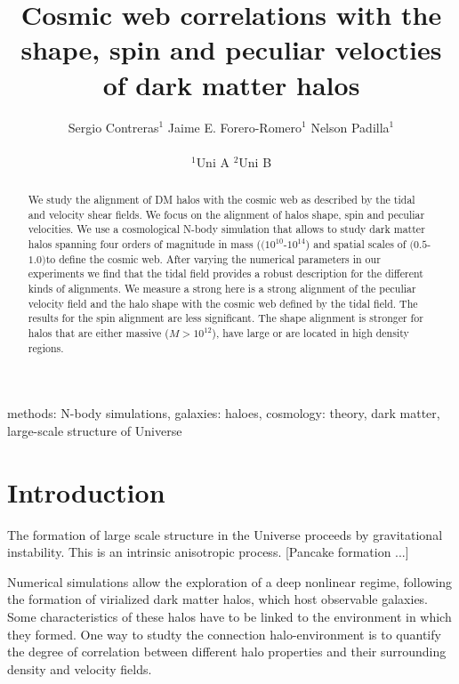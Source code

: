 \documentclass[usenatbib]{mn2e}
\newcommand{\hMpc}{{\ifmmode{h^{-1}{\rm Mpc}}\else{$h^{-1}$Mpc }\fi}}
\newcommand{\hMsun}{{\ifmmode{h^{-1}{\rm
        {M_{\odot}}}}\else{$h^{-1}{\rm{M_{\odot}}}$}\fi}}
\begin{document}
\title[Vweb \& Tweb]{Cosmic web correlations with the shape, spin and
  peculiar velocties of dark matter halos}  
\author[S. Contreras et al.]{
\parbox[t]{\textwidth}{\raggedright 
  Sergio Contreras$^{1}$ 
  Jaime E. Forero-Romero$^{1}$ 
  Nelson Padilla$^{1}$ 
}
\vspace*{6pt}\\
$^{1}$Uni A
$^{2}$Uni B
}
\maketitle

\begin{abstract}

We study
the alignment of DM halos with the cosmic web as described by the
tidal and velocity shear fields. We focus on the alignment of halos
shape, spin and peculiar velocities. We use a cosmological N-body
simulation that allows to study dark matter halos spanning four orders
of magnitude in mass ($(10^{10}$-$10^{14}$) \hMsun and spatial
scales of $(0.5$-$1.0)$\hMpc to define the cosmic web. After varying
the numerical parameters in our experiments we find that the tidal
field provides a robust description for the different kinds of
alignments.  We measure a strong here is a strong alignment of the
peculiar velocity field and the halo shape with the cosmic web defined
by the tidal field. The results for the spin alignment are less
significant. The shape alignment is stronger for halos that are either
 massive ($M>10^{12}$\hMsun), have large or are located in high
 density regions.  


\end{abstract}
\begin{keywords}
methods: N-body simulations, galaxies: haloes, cosmology: theory, dark
matter, large-scale structure of Universe 
\end{keywords}


\section{Introduction}
\label{sec:introduction}

The formation of large scale structure in the Universe proceeds by
gravitational instability. This is an intrinsic anisotropic
process. [Pancake formation ...] 


Numerical simulations allow the exploration of a deep nonlinear
regime, following the formation of virialized dark matter halos, which
host observable galaxies. Some characteristics of these halos have to
be linked to the environment in which they formed. One way to studty
the connection halo-environment is to quantify the degree of
correlation between different halo properties and their surrounding
density and velocity fields. 
\end{document}
